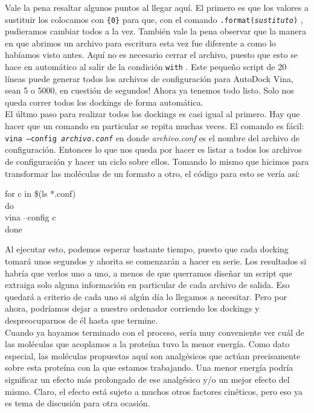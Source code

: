 \documentclass[10pt,letterpaper]{article}
\newcommand{\inlinecode}[1]{
\colorbox{light-gray}{\texttt{#1}}
}
\newenvironment{Code}
{
\begin{lrbox}{\selvestebox}%
\begin{minipage}{\dimexpr\columnwidth-2\fboxsep\relax}
\fontfamily{\ttdefault}\selectfont
}
{\end{minipage}\end{lrbox}%
\begin{center}
\colorbox{light-gray}{\usebox{\selvestebox}}
\end{center}
}
\begin{document}
Vale la pena resaltar algunos puntos al llegar aqu\'i. El primero es que los valores a sustituir los colocamos con \inlinecode{\{0\}} para que, con el comando \inlinecode{.format(\emph{sustituto})}, pudieramos cambiar todos a la vez. Tambi\'en vale la pena observar que la manera en que abrimos un archivo para escritura esta vez fue diferente a como lo hab\'iamos visto antes. Aqu\'i no es necesario cerrar el archivo, puesto que esto se hace en autom\'atico al salir de la condici\'on \inlinecode{with}. Este peque\~no script de 20 l\'ineas puede generar todos los archivos de configuraci\'on para AutoDock Vina, sean 5 o 5000, en cuesti\'on de segundos! Ahora ya tenemos todo listo. Solo nos queda correr todos los dockings de forma autom\'atica.\\

El \'ultmo paso para realizar todos los dockings es casi igual al primero. Hay que hacer que un comando en particular se repita muchas veces. El comando es f\'acil: \inlinecode{vina --config \emph{archivo.conf}} en donde \emph{archivo.conf} es el nombre del archivo de configuraci\'on. Entonces lo que nos queda por hacer es listar a todos los archivos de configuraci\'on y hacer un ciclo sobre ellos. Tomando lo mismo que hicimos para transformar las mol\'eculas de un formato a otro, el c\'odigo para esto se ver\'ia as\'i:

\begin{Code}
for c in \$(ls *.conf)\\
do\\
vina --config c\\
done
\end{Code}

Al ejecutar esto, podemos esperar bastante tiempo, puesto que cada docking tomar\'a unos segundos y ahorita se comenzar\'an a hacer en serie. Los resultados si habr\'ia que verlos uno a uno, a menos de que querramos dise\~nar un script que extraiga solo alguna informaci\'on en particular de cada archivo de salida. Eso quedar\'a a criterio de cada uno si alg\'un d\'ia lo llegamos a necesitar. Pero por ahora, podr\'iamos dejar a nuestro ordenador corriendo los dockings y despreocuparnos de \'el hasta que termine.\\

Cuando ya hayamos terminado con el proceso, ser\'ia muy conveniente ver cu\'al de las mol\'eculas que acoplamos a la prote\'ina tuvo la menor energ\'ia. Como dato especial, las mol\'eculas propuestas aqu\'i son analg\'esicos que act\'uan precisamente sobre esta prote\'ina con la que estamos trabajando. Una menor energ\'ia podr\'ia significar un efecto m\'as prolongado de ese analg\'esico y/o un mejor efecto del mismo. Claro, el efecto est\'a sujeto a muchos otros factores cin\'eticos, pero eso ya es tema de discusi\'on para otra ocasi\'on.
\end{document}
